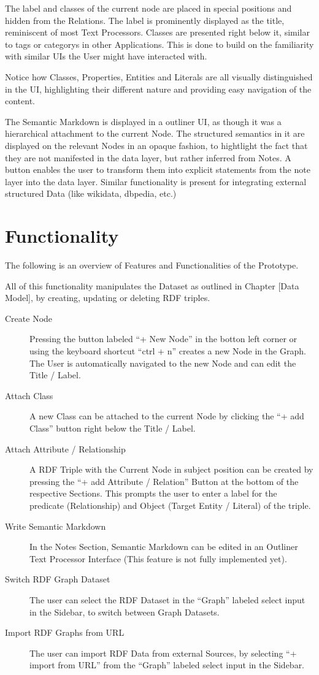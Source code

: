 The label and classes of the current node are placed in special positions and hidden from the Relations. The label is prominently displayed as the title, reminiscent of most Text Processors. Classes are presented right below it, similar to tags or categorys in other Applications. This is done to build on the familiarity with similar UIs the User might have interacted with.
    
Notice how Classes, Properties, Entities and Literals are all visually distinguished in the UI, highlighting their different nature and providing easy navigation of the content.

The Semantic Markdown is displayed in a outliner UI, as though it was a hierarchical attachment to the current Node. The structured semantics in it are displayed on the relevant Nodes in an opaque fashion, to hightlight the fact that they are not manifested in the data layer, but rather inferred from Notes. A button enables the user to transform them into explicit statements from the note layer into the data layer. Similar functionality is present for integrating external structured Data (like wikidata, dbpedia, etc.)

\section{Functionality}

The following is an overview of Features and Functionalities of the Prototype.

All of this functionality manipulates the Dataset as outlined in Chapter [Data Model], by creating, updating or deleting RDF triples.
\begin{description}
    \item[Create Node] Pressing the button labeled “+ New Node” in the botton left corner or using the keyboard shortcut “ctrl + n” creates a new Node in the Graph. The User is automatically navigated to the new Node and can edit the Title / Label.
    \item[Attach Class] A new Class can be attached to the current Node by clicking the “+ add Class” button right below the Title / Label.
    \item[Attach Attribute / Relationship] A RDF Triple with the Current Node in subject position can be created by pressing the “+ add Attribute / Relation” Button at the bottom of the respective Sections. This prompts the user to enter a label for the predicate (Relationship) and Object (Target Entity / Literal) of the triple.
    \item[Write Semantic Markdown] In the Notes Section, Semantic Markdown can be edited in an Outliner Text Processor Interface (This feature is not fully implemented yet).
    \item[Switch RDF Graph Dataset] The user can select the RDF Dataset in the “Graph” labeled select input in the Sidebar, to switch between Graph Datasets.
    \item[Import RDF Graphs from URL] The user can import RDF Data from external Sources, by selecting “+ import from URL” from the “Graph” labeled select input in the Sidebar.
\end{description}

